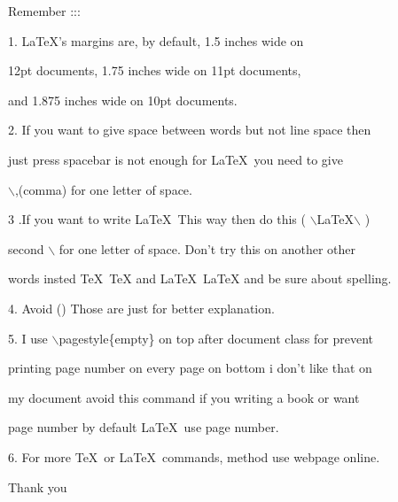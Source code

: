 \documentclass[11pt]{article}
\begin{document}
Remember :::

\vspace{0.5cm}

1. LaTeX's margins are, by default, 1.5 inches wide on 

12pt documents, 1.75 inches wide on 11pt documents,

and 1.875 inches wide on 10pt documents.
 
 
2. If you want to give space between words but not line space then 

just press spacebar is not enough for \LaTeX\ you need to give 

$\backslash$,(comma) for one letter of space.



3 .If you want to write \LaTeX\ This way then do this ( $\backslash$LaTeX$\backslash$ )

 second $\backslash$ for one letter of space. Don't try this on another other 
 
 words insted \TeX\ TeX and \LaTeX\ LaTeX and be sure about spelling.

4. Avoid () Those are just for better explanation.

5. I use $\backslash$pagestyle\{empty\} on top after document class for prevent 

printing page number on every page on bottom i don't like that on

 my document avoid this command if you writing a book or want
 
  page number by default \LaTeX\ use page number.

6. For more \TeX\ or \LaTeX\ commands, method use webpage online.

\vspace{10cm}

\begin{center}
\Huge Thank you
\end{center}
\end{document}
